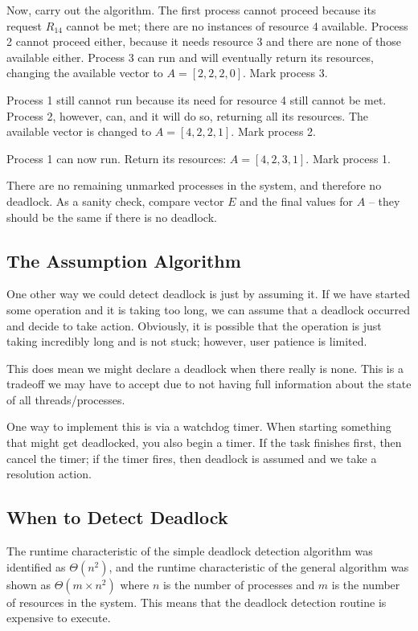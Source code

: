 Now, carry out the algorithm. The first process cannot proceed because its request $R_{14}$ cannot be met; there are no instances of resource 4 available. Process 2 cannot proceed either, because it needs resource 3 and there are none of those available either. Process 3 can run and will eventually return its resources, changing the available vector to $A = [2, 2, 2, 0]$. Mark process 3.

Process 1 still cannot run because its need for resource 4 still cannot be met. Process 2, however, can, and it will do so, returning all its resources. The available vector is changed to $A = [4, 2, 2, 1]$. Mark process 2.

Process 1 can now run. Return its resources: $A = [4, 2, 3, 1]$. Mark process 1.

There are no remaining unmarked processes in the system, and therefore no deadlock. As a sanity check, compare vector $E$ and the final values for $A$ -- they should be the same if there is no deadlock.

\subsection*{The Assumption Algorithm}

One other way we could detect deadlock is just by assuming it. If we have started some operation and it is taking too long, we can assume that a deadlock occurred and decide to take action. Obviously, it is possible that the operation is just taking incredibly long and is not stuck; however, user patience is limited. 

This does mean we might declare a deadlock when there really is none. This is a tradeoff we may have to accept due to not having full information about the state of all threads/processes.

One way to implement this is via a watchdog timer. When starting something that might get deadlocked, you also begin a timer. If the task finishes first, then cancel the timer; if the timer fires, then deadlock is assumed and we take a resolution action.

\subsection*{When to Detect Deadlock}
The runtime characteristic of the simple deadlock detection algorithm was identified as $\Theta(n^{2})$, and the runtime characteristic of the general algorithm was shown as $\Theta(m \times n^{2})$ where $n$ is the number of processes and $m$ is the number of resources in the system. This means that the deadlock detection routine is expensive to execute.

